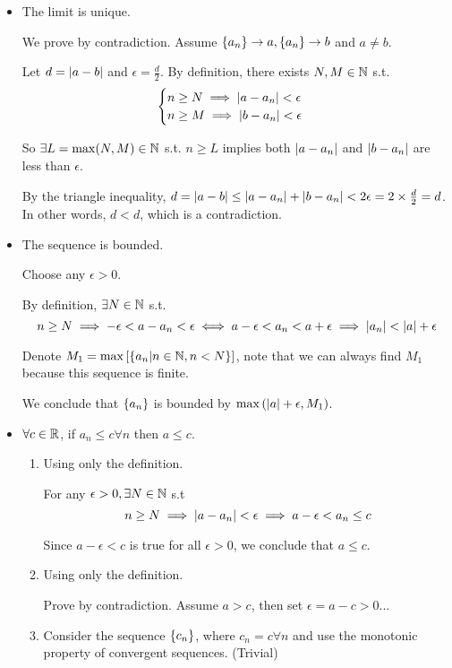 \begin{itemize}
    \item The limit is unique.
    
    We prove by contradiction. Assume $\left\{a_n\right\}\to a, \left\{a_n\right\}\to b$ and $a\neq b$.
    
    Let $d = \left|a-b\right|$ and $\epsilon = \frac{d}{2}$.
    By definition, there exists $N, M\in\mathbb{N}$ s.t.
    \[\begin{cases}
        n\geq N \implies \left|a - a_n\right| < \epsilon \\
        n\geq M \implies \left|b - a_n\right| < \epsilon
    \end{cases} \]

    So $\exists L = \max(N, M) \in \mathbb{N}$ s.t. $n \geq L$ implies both $\left|a - a_n\right|$ and $\left|b - a_n\right|$ are less than $\epsilon$.
    
    By the triangle inequality, $d = \left|a-b\right| \leq \left|a - a_n\right| + \left|b - a_n\right| < 2\epsilon = 2\times\frac{d}{2} = d$. In other words, $d < d$, which is a contradiction.

    \item The sequence is bounded.
    
    Choose any $\epsilon > 0$.
    
    By definition, $\exists N\in\mathbb{N}$ s.t.
    \[ n\geq N \implies -\epsilon < a-a_n < \epsilon \iff a-\epsilon < a_n < a+\epsilon \implies \left|a_n\right| < \left|a\right| + \epsilon \]

    Denote $M_1 = \max\left[\left\{a_n | n\in\mathbb{N}, n < N\right\}\right]$, note that we can always find $M_1$ because this sequence is finite.
    
    We conclude that $\left\{a_n\right\}$ is bounded by $\max\left(\left|a\right| + \epsilon, M_1\right)$.

    \item $\forall c \in \mathbb{R}$, if $a_n \leq c \forall n$ then $a \leq c$.
    
    \begin{enumerate}[label=\underline{Approach \arabic*)}]
        \item Using only the definition.
        
        For any $\epsilon > 0, \exists N\in\mathbb{N}$ s.t
        \[ n \geq N \implies \left|a - a_n\right| < \epsilon \implies a-\epsilon < a_n \leq c\]

        Since $a-\epsilon < c$ is true for all $\epsilon > 0$, we conclude that $a \leq c$.
        
        \item Using only the definition.
        
        Prove by contradiction. Assume $a > c$, then set $\epsilon = a - c > 0$...
        
        \item Consider the sequence $\left\{c_n\right\}$, where $c_n = c \forall n$ and use the monotonic property of convergent sequences. (Trivial)
    \end{enumerate}
\end{itemize}
